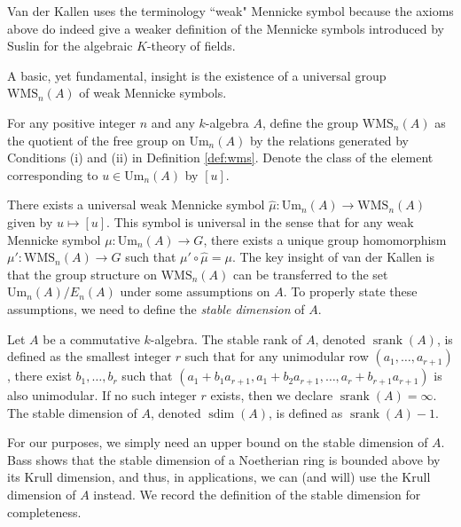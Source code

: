 \begin{remark}
    Van der Kallen uses the terminology ``weak" Mennicke symbol because the axioms above do indeed give a weaker definition of the Mennicke symbols introduced by Suslin \cite{Suslin-Mennicke} for the algebraic $K$-theory of fields.
\end{remark}

A basic, yet fundamental, insight is the existence of a universal group $\mathrm{WMS}_n(A)$ of weak Mennicke symbols.

\begin{definition}
    For any positive integer $n$ and any $k$-algebra $A$, define the group $\mathrm{WMS}_n(A)$ as the quotient of the free group on $\mathrm{Um}_n(A)$ by the relations generated by Conditions (i) and (ii) in Definition \ref{def:wms}. Denote the class of the element corresponding to $u\in \mathrm{Um}_n(A)$ by $[u]$.
\end{definition}

There exists a universal weak Mennicke symbol $\hat{\mu}\colon \mathrm{Um}_n(A) \to \mathrm{WMS}_n(A)$ given by $u \mapsto [u]$. This symbol is universal in the sense that for any weak Mennicke symbol $\mu\colon \mathrm{Um}_n(A) \to G$, there exists a unique group homomorphism $\mu'\colon \mathrm{WMS}_n(A) \to G$ such that $\mu' \circ \hat{\mu} = \mu$. The key insight of van der Kallen is that the group structure on $\mathrm{WMS}_n(A)$ can be transferred to the set $\mathrm{Um}_n(A)/E_n(A)$ under some assumptions on $A$. To properly state these assumptions, we need to define the \textit{stable dimension} of $A$.

\begin{definition}
    Let $A$ be a commutative $k$-algebra. The stable rank of $A$, denoted $\operatorname{srank}(A)$, is defined as the smallest integer $r$ such that for any unimodular row $(a_1,\ldots,a_{r+1})$, there exist $b_1,\ldots,b_r$ such that $(a_1 + b_1a_{r+1}, a_1 + b_2a_{r+1},\ldots, a_{r}+b_{r+1}a_{r+1})$ is also unimodular. If no such integer $r$ exists, then we declare $\operatorname{srank}(A) = \infty$. The stable dimension of $A$, denoted $\operatorname{sdim}(A)$, is defined as $\operatorname{srank}(A) - 1$. 
\end{definition}

\begin{remark}
    For our purposes, we simply need an upper bound on the stable dimension of $A$. Bass \cite[Theorem 1]{Bass-liberation} shows that the stable dimension of a Noetherian ring is bounded above by its Krull dimension, and thus, in applications, we can (and will) use the Krull dimension of $A$ instead. We record the definition of the stable dimension for completeness.
\end{remark}

